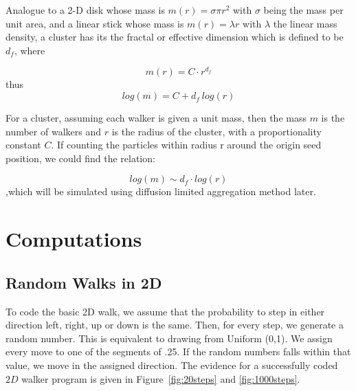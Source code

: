 \documentclass[12pt]{article}
\begin{document}
Analogue to a 2-D disk whose mass is $m(r)=\sigma \pi r^2$ with $\sigma$ being the mass per unit area, and a linear stick whose mass is $m(r)=\lambda r$ with $\lambda$ the linear mass density, a cluster has its the fractal or effective dimension which is defined to be $d_f$, where

\begin{equation}
  \label{eq:fractaldimension1}
     m(r)=C\cdot r^{d_f}
\end{equation}
thus
\begin{equation}
  \label{eq:fractaldimension2}
     log(m)=C+d_f\ log(r)
\end{equation}

For a cluster, assuming each walker is given a unit mass, then the mass $m$ is the number of walkers and $r$ is the radius of the cluster, with a proportionality constant $C$. If counting the particles within radius r around the origin seed position, we could find the relation:

\begin{equation}
  \label{eq:fractaldimension3}
     log(m) \sim d_f \cdot log(r)
\end{equation}
,which will be simulated using diffusion limited aggregation method later.
 



\section{Computations}
\label{sec:computations}

\subsection{Random Walks in 2D}
\label{sec:computationsRandomWalk}
To code the basic 2D walk, we assume that the probability to step in either direction left, right, up or down is the same. Then, for every step, we generate a random number. This is equivalent to drawing from Uniform (0,1). We assign every move to one of the segments of .25. If the random numbers falls within that value, we move in the assigned direction. The evidence for a successfully coded $2D$ walker program is given in Figure~\ref{fig:20steps} and \ref{fig:1000steps}.


\end{document}
